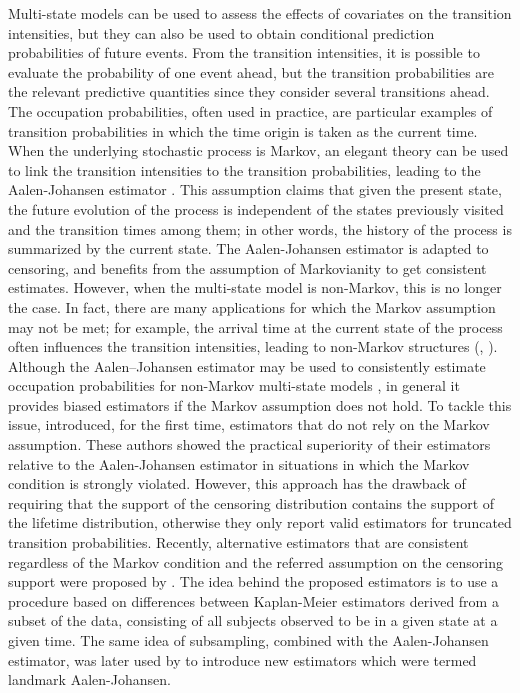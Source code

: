 Multi-state models can be used to assess the effects of covariates on the transition intensities, but they can also be used to obtain conditional prediction probabilities of future events. From the transition intensities, it is possible to evaluate the probability of one event ahead, but the transition probabilities are the relevant predictive quantities since they consider several transitions ahead. The occupation probabilities, often used in practice, are particular examples of transition probabilities in which the time origin is taken as the current time. When the underlying stochastic process is Markov, an elegant theory can be used to link the transition intensities to the transition probabilities, leading to the Aalen-Johansen estimator \citep{AJ1978}. This assumption claims that given the present state, the future evolution of the process is independent of the states previously visited and the transition times among them; in other words, the history of the process is summarized by the current state. The Aalen-Johansen estimator is adapted to censoring, and benefits from the assumption of Markovianity to get consistent estimates. However, when the multi-state model is non-Markov, this is no longer the case. In fact, there are many applications for which the Markov assumption may not be met; for example, the arrival time at the current state of the process often influences the transition intensities, leading to non-Markov structures (\citealp{Andersen2000}, \citealp{Andersen2002}). Although the Aalen–Johansen estimator may be used to consistently estimate occupation probabilities for non-Markov multi-state models \citep{Datta2001}, in general it provides biased estimators if the Markov assumption does not hold. To tackle this issue, \cite{MM2006} introduced, for the first time, estimators that do not rely on the Markov assumption. These authors showed the practical superiority of their estimators relative to the Aalen-Johansen estimator in situations in which the Markov condition is strongly violated. However, this approach has the drawback of requiring that the support of the censoring distribution contains the support of the lifetime distribution, otherwise they only report valid estimators for truncated transition probabilities. Recently, alternative estimators that are consistent regardless of the Markov condition and the referred assumption on the censoring support were proposed by \cite{AlvarezMM2015}. The idea behind the proposed estimators is to use a procedure based on differences between Kaplan-Meier estimators derived from a subset of the data, consisting of all subjects observed to be in a given state at a given time. The same idea of subsampling, combined with the Aalen-Johansen estimator, was later used by \citet{PutterSpitoni2018} to introduce new estimators which were termed landmark Aalen-Johansen.

